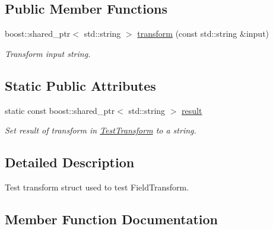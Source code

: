 \subsection*{Public Member Functions}
\begin{DoxyCompactItemize}
\item 
boost\+::shared\+\_\+ptr$<$ std\+::string $>$ \hyperlink{structtudat_1_1unit__tests_1_1TestTransform_aa68c181987c9d82d51bcfae675c6fdba}{transform} (const std\+::string \&input)
\begin{DoxyCompactList}\small\item\em Transform input string. \end{DoxyCompactList}\end{DoxyCompactItemize}
\subsection*{Static Public Attributes}
\begin{DoxyCompactItemize}
\item 
static const boost\+::shared\+\_\+ptr$<$ std\+::string $>$ \hyperlink{structtudat_1_1unit__tests_1_1TestTransform_a2185476a49d70f8f099a1db3748c624d}{result}\hypertarget{structtudat_1_1unit__tests_1_1TestTransform_a2185476a49d70f8f099a1db3748c624d}{}\label{structtudat_1_1unit__tests_1_1TestTransform_a2185476a49d70f8f099a1db3748c624d}

\begin{DoxyCompactList}\small\item\em Set result of transform in \hyperlink{structtudat_1_1unit__tests_1_1TestTransform}{Test\+Transform} to a string. \end{DoxyCompactList}\end{DoxyCompactItemize}


\subsection{Detailed Description}
Test transform struct used to test Field\+Transform. 

\subsection{Member Function Documentation}
